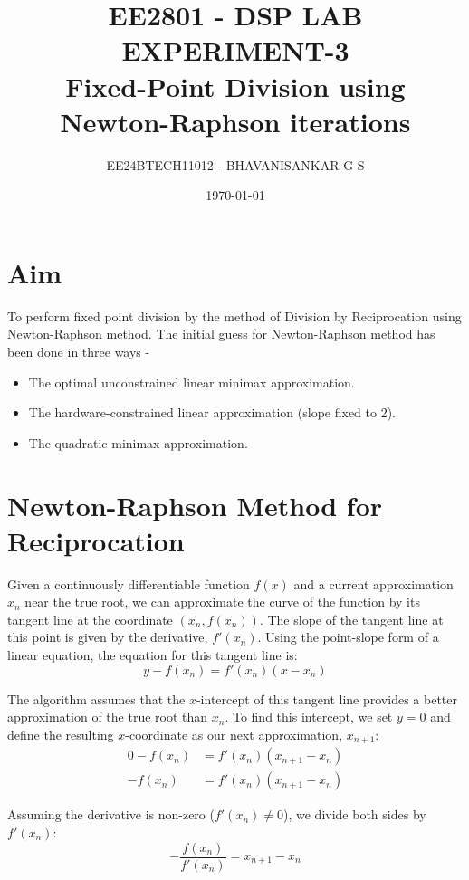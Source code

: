 \documentclass{article}
\title{\textbf{EE2801 - DSP LAB \\ EXPERIMENT-3} \\ Fixed-Point Division using Newton-Raphson iterations}
\author{EE24BTECH11012 - BHAVANISANKAR G S}
\date{\today}
\begin{document}
\maketitle

\tableofcontents

\newpage
\section{Aim}
To perform fixed point division by the method of Division by Reciprocation using Newton-Raphson method. The initial guess for Newton-Raphson method has been done in three ways - 
\begin{itemize}
    \item The optimal unconstrained linear minimax approximation.
    \item The hardware-constrained linear approximation (slope fixed to 2).
    \item The quadratic minimax approximation.
\end{itemize}

\section{Newton-Raphson Method for Reciprocation}

Given a continuously differentiable function $f(x)$ and a current approximation $x_n$ near the true root, we can approximate the curve of the function by its tangent line at the coordinate $(x_n, f(x_n))$. The slope of the tangent line at this point is given by the derivative, $f'(x_n)$. Using the point-slope form of a linear equation, the equation for this tangent line is:
\begin{equation}
    y - f(x_n) = f'(x_n)(x - x_n)
\end{equation}

The algorithm assumes that the $x$-intercept of this tangent line provides a better approximation of the true root than $x_n$. To find this intercept, we set $y = 0$ and define the resulting $x$-coordinate as our next approximation, $x_{n+1}$:
\begin{align*}
    0 - f(x_n) &= f'(x_n)(x_{n+1} - x_n) \\
    -f(x_n) &= f'(x_n)(x_{n+1} - x_n)
\end{align*}

Assuming the derivative is non-zero ($f'(x_n) \neq 0$), we divide both sides by $f'(x_n)$:
\begin{equation}
    -\frac{f(x_n)}{f'(x_n)} = x_{n+1} - x_n
\end{equation}
\end{document}
